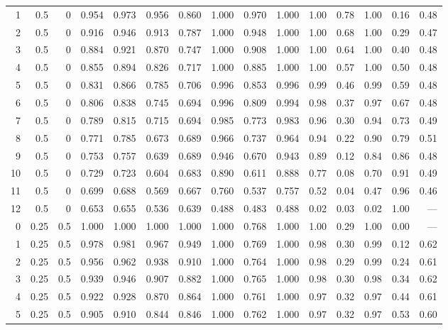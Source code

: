 \begin{landscape}
\begin{longtable}{rrrrrrrrrrrrrrr}
1 & 0.5 & 0 & 0.954 & 0.973 & 0.956 & 0.860 & 1.000 & 0.970 & 1.000 & 1.00 & 0.78 & 1.00 & 0.16 & 0.48 \\
2 & 0.5 & 0 & 0.916 & 0.946 & 0.913 & 0.787 & 1.000 & 0.948 & 1.000 & 1.00 & 0.68 & 1.00 & 0.29 & 0.47 \\
3 & 0.5 & 0 & 0.884 & 0.921 & 0.870 & 0.747 & 1.000 & 0.908 & 1.000 & 1.00 & 0.64 & 1.00 & 0.40 & 0.48 \\
4 & 0.5 & 0 & 0.855 & 0.894 & 0.826 & 0.717 & 1.000 & 0.885 & 1.000 & 1.00 & 0.57 & 1.00 & 0.50 & 0.48 \\
5 & 0.5 & 0 & 0.831 & 0.866 & 0.785 & 0.706 & 0.996 & 0.853 & 0.996 & 0.99 & 0.46 & 0.99 & 0.59 & 0.48 \\
6 & 0.5 & 0 & 0.806 & 0.838 & 0.745 & 0.694 & 0.996 & 0.809 & 0.994 & 0.98 & 0.37 & 0.97 & 0.67 & 0.48 \\
7 & 0.5 & 0 & 0.789 & 0.815 & 0.715 & 0.694 & 0.985 & 0.773 & 0.983 & 0.96 & 0.30 & 0.94 & 0.73 & 0.49 \\
8 & 0.5 & 0 & 0.771 & 0.785 & 0.673 & 0.689 & 0.966 & 0.737 & 0.964 & 0.94 & 0.22 & 0.90 & 0.79 & 0.51 \\
9 & 0.5 & 0 & 0.753 & 0.757 & 0.639 & 0.689 & 0.946 & 0.670 & 0.943 & 0.89 & 0.12 & 0.84 & 0.86 & 0.48 \\
10 & 0.5 & 0 & 0.729 & 0.723 & 0.604 & 0.683 & 0.890 & 0.611 & 0.888 & 0.77 & 0.08 & 0.70 & 0.91 & 0.49 \\
11 & 0.5 & 0 & 0.699 & 0.688 & 0.569 & 0.667 & 0.760 & 0.537 & 0.757 & 0.52 & 0.04 & 0.47 & 0.96 & 0.46 \\
12 & 0.5 & 0 & 0.653 & 0.655 & 0.536 & 0.639 & 0.488 & 0.483 & 0.488 & 0.02 & 0.03 & 0.02 & 1.00 & --- \\
\midrule
0 & 0.25 & 0.5 & 1.000 & 1.000 & 1.000 & 1.000 & 1.000 & 0.768 & 1.000 & 1.00 & 0.29 & 1.00 & 0.00 & --- \\
1 & 0.25 & 0.5 & 0.978 & 0.981 & 0.967 & 0.949 & 1.000 & 0.769 & 1.000 & 0.98 & 0.30 & 0.99 & 0.12 & 0.62 \\
2 & 0.25 & 0.5 & 0.956 & 0.962 & 0.938 & 0.910 & 1.000 & 0.764 & 1.000 & 0.98 & 0.29 & 0.99 & 0.24 & 0.61 \\
3 & 0.25 & 0.5 & 0.939 & 0.946 & 0.907 & 0.882 & 1.000 & 0.765 & 1.000 & 0.98 & 0.30 & 0.98 & 0.34 & 0.62 \\
4 & 0.25 & 0.5 & 0.922 & 0.928 & 0.870 & 0.864 & 1.000 & 0.761 & 1.000 & 0.97 & 0.32 & 0.97 & 0.44 & 0.61 \\
5 & 0.25 & 0.5 & 0.905 & 0.910 & 0.844 & 0.846 & 1.000 & 0.762 & 1.000 & 0.97 & 0.32 & 0.97 & 0.53 & 0.60 \\

\end{longtable}
\end{landscape}
